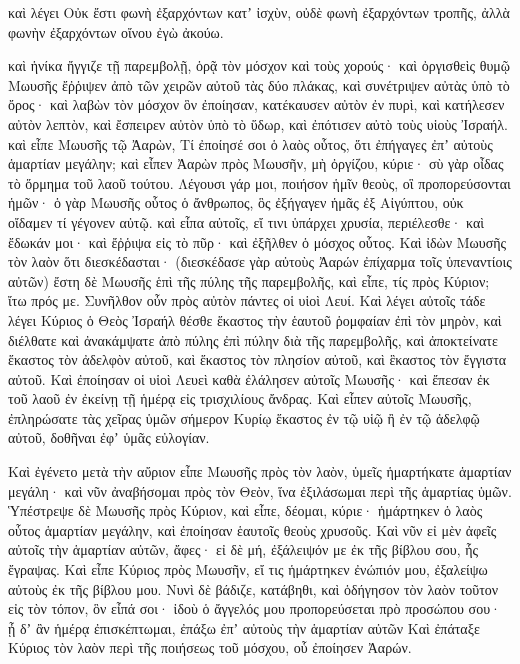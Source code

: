 {καὶ λέγει Οὐκ ἔστι φωνὴ ἐξαρχόντων κατʼ ἰσχὺν, οὐδὲ φωνὴ ἐξαρχόντων τροπῆς, ἀλλὰ φωνὴν ἐξαρχόντων οἴνου ἐγὼ ἀκούω.
\par }{\PP {}καὶ ἡνίκα ἤγγιζε τῇ παρεμβολῇ, ὁρᾷ τὸν μόσχον καὶ τοὺς χορούς· καὶ ὀργισθεὶς θυμῷ Μωυσῆς ἔῤῥιψεν ἀπὸ τῶν χειρῶν αὐτοῦ τὰς δύο πλάκας, καὶ συνέτριψεν αὐτὰς ὑπὸ τὸ ὄρος·
καὶ λαβὼν τὸν μόσχον ὃν ἐποίησαν, κατέκαυσεν αὐτὸν ἐν πυρὶ, καὶ κατήλεσεν αὐτὸν λεπτὸν, καὶ ἔσπειρεν αὐτὸν ὑπὸ τὸ ὕδωρ, καὶ ἐπότισεν αὐτὸ τοὺς υἱοὺς Ἰσραήλ.
καὶ εἶπε Μωυσῆς τῷ Ἀαρὼν, Τί ἐποίησέ σοι ὁ λαὸς οὗτος, ὅτι ἐπήγαγες ἐπʼ αὐτοὺς ἁμαρτίαν μεγάλην;
καὶ εἶπεν Ἀαρὼν πρὸς Μωυσῆν, μὴ ὀργίζου, κύριε· σὺ γὰρ οἶδας τὸ ὅρμημα τοῦ λαοῦ τούτου.
Λέγουσι γάρ μοι, ποιήσον ἡμῖν θεοὺς, οἳ προπορεύσονται ἡμῶν· ὁ γὰρ Μωυσῆς οὗτος ὁ ἄνθρωπος, ὃς ἐξήγαγεν ἡμᾶς ἐξ Αἰγύπτου, οὐκ οἴδαμεν τί γέγονεν αὐτῷ.
καὶ εἶπα αὐτοῖς, εἴ τινι ὑπάρχει χρυσία, περιέλεσθε· καὶ ἔδωκάν μοι· καὶ ἔῤῥιψα εἰς τὸ πῦρ· καὶ ἐξῆλθεν ὁ μόσχος οὗτος.
Καὶ ἰδὼν Μωυσῆς τὸν λαὸν ὅτι διεσκέδασται· (διεσκέδασε γὰρ αὐτοὺς Ἀαρών ἐπίχαρμα τοῖς ὑπεναντίοις αὐτῶν)
ἔστη δὲ Μωυσῆς ἑπὶ τῆς πύλης τῆς παρεμβολῆς, καὶ εἶπε, τίς πρὸς Κύριον; ἴτω πρός με. Συνῆλθον οὖν πρὸς αὐτὸν πάντες οἱ υἱοὶ Λευί.
Καὶ λέγει αὐτοῖς τάδε λέγει Κύριος ὁ Θεὸς Ἰσραήλ θέσθε ἕκαστος τὴν ἑαυτοῦ ῥομφαίαν ἐπὶ τὸν μηρὸν, καὶ διέλθατε καὶ ἀνακάμψατε ἀπὸ πύλης ἐπὶ πύλην διὰ τῆς παρεμβολῆς, καὶ ἀποκτείνατε ἕκαστος τὸν ἀδελφὸν αὐτοῦ, καὶ ἕκαστος τὸν πλησίον αὐτοῦ, καὶ ἓκαστος τὸν ἔγγιστα αὐτοῦ.
Καὶ ἐποίησαν οἱ υἱοὶ Λευεὶ καθὰ ἐλάλησεν αὐτοῖς Μωυσῆς· καὶ ἔπεσαν ἐκ τοῦ λαοῦ ἐν ἐκείνῃ τῇ ἡμέρᾳ εἰς τρισχιλίους ἄνδρας.
Καὶ εἶπεν αὐτοῖς Μωυσῆς, ἐπληρώσατε τὰς χεῖρας ὑμῶν σήμερον Κυρίῳ ἕκαστος ἐν τῷ υἱῷ ἢ ἐν τῷ ἀδελφῷ αὐτοῦ, δοθῆναι ἐφʼ ὑμᾶς εὐλογίαν.
\par }{\PP {}Καὶ ἐγένετο μετὰ τὴν αὔριον εἶπε Μωυσῆς πρὸς τὸν λαὸν, ὑμεῖς ἡμαρτήκατε ἁμαρτίαν μεγάλη· καὶ νῦν ἀναβήσομαι πρὸς τὸν Θεὸν, ἵνα ἐξιλάσωμαι περὶ τῆς ἁμαρτίας ὑμῶν.
Ὑπέστρεψε δὲ Μωυσῆς πρὸς Κύριον, καὶ εἶπε, δέομαι, κύριε· ἡμάρτηκεν ὁ λαὸς οὗτος ἁμαρτίαν μεγάλην, καὶ ἐποίησαν ἑαυτοῖς θεοὺς χρυσοῦς.
Καὶ νῦν εἰ μὲν ἀφεῖς αὐτοῖς τὴν ἁμαρτίαν αὐτῶν, ἄφες· εἰ δὲ μή, ἐξάλειψόν με ἐκ τῆς βίβλου σου, ἧς ἔγραψας.
Καὶ εἶπε Κύριος πρὸς Μωυσῆν, εἴ τις ἡμάρτηκεν ἐνώπιόν μου, ἐξαλείψω αὐτοὺς ἐκ τῆς βίβλου μου.
Νυνὶ δὲ βάδιζε, κατάβηθι, καὶ ὁδήγησον τὸν λαὸν τοῦτον εἰς τὸν τόπον, ὃν εἶπά σοι· ἰδοὺ ὁ ἄγγελός μου προπορεύσεται πρὸ προσώπου σου· ᾖ δʼ ἂν ἡμέρᾳ ἐπισκέπτωμαι, ἐπάξω ἐπʼ αὐτοὺς τὴν ἁμαρτίαν αὐτῶν
Καὶ ἐπάταξε Κύριος τὸν λαὸν περὶ τῆς ποιήσεως τοῦ μόσχου, οὗ ἐποίησεν Ἀαρών.

}
